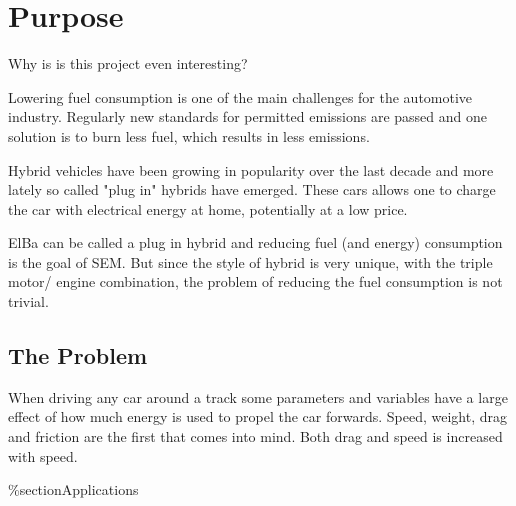 \chapter{Purpose}

Why is is this project even interesting?

Lowering fuel consumption is one of the main challenges for the automotive 
industry. Regularly new standards for permitted emissions are passed and  
one solution is to burn less fuel, which results in less emissions.

Hybrid vehicles have been growing in popularity over the last decade and 
more lately so called "plug in" hybrids have emerged. These cars allows one 
to charge the car with electrical energy at home, potentially at a low price.

ElBa can be called a plug in hybrid and reducing fuel (and energy) consumption is the goal of SEM. But since the style of hybrid is very unique, with the triple motor/ engine combination, the problem of reducing the fuel consumption is not trivial. 

\section{The Problem}
When driving any car around a track some parameters and variables have a large effect of how much energy is used to propel the car forwards. Speed, weight, drag and friction are the first that comes into mind. Both drag and speed is increased with speed.
  
\%section{Applications}
